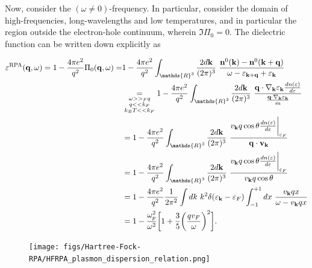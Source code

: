 Now, consider the $(\omega \neq 0)$-frequency. In particular, consider the domain of high-frequencies, long-wavelengths and low temperatures, and in particular the region outside the electron-hole continuum, wherein $\Im \Pi_0 = 0$. The dielectric function can be written down explicitly as 

\begin{equation}
    \begin{split}
        \varepsilon^{\textnormal{RPA}}({\bf q}, \omega) = 1 - \frac{4\pi e^2}{q^2} \Pi_0({\bf q}, \omega) =& 1 - \frac{4\pi e^2}{q^2} \int_{\mathds{R}^3} \frac{2d{\bf k}}{(2\pi)^3} \blanky \frac{{\bf n}^0({\bf k}) - {\bf n}^0({\bf k+q})}{\omega - \varepsilon_{{\bf k+q}} + \varepsilon_{{\bf k}}} \\
        & \underset{{\substack{\omega >> _F q \\
        q << k_F \\
        k_B T << k_F}}}{=} 1 - \frac{4\pi e^2}{q^2} \int_{\mathds{R}^3} \frac{2d{\bf k}}{(2\pi)^3} \blanky \frac{
        {\bf q} \cdot \nabla_{{\bf k}}
        \varepsilon_{{\bf k}} \frac{d n(\varepsilon)}{d\varepsilon}}
        { \frac{{\bf q} \cdot \nabla_{{\bf k}} \varepsilon_{{\bf k}}}{m} } \\
        &= 1 - \frac{4\pi e^2}{q^2} \int_{\mathds{R}^3} \frac{2d{\bf k}}{(2\pi)^3} \blanky \frac{ v_{{\bf k}} q \cos \theta \frac{dn(\varepsilon)}{d\varepsilon}\bigg|_{\varepsilon_F}
        }
        { {\bf q} \cdot {\bf v}_{{\bf k}} } \\
        &= 1 - \frac{4\pi e^2}{q^2} \int_{\mathds{R}^3} \frac{2d{\bf k}}{(2\pi)^3} \blanky \frac{ v_{{\bf k}} q \cos \theta \frac{dn(\varepsilon)}{d\varepsilon}\bigg|_{\varepsilon_F}
        }
        { {v}_{{\bf k}} q \cos \theta} \\
        &= 1 - \frac{4\pi e^2}{q^2} \frac{1}{2\pi^2}\int dk \blanky k^2 \delta(\varepsilon_{{\bf k}} - \varepsilon_F) \int_{-1}^{+1} dx \blanky \frac{v_{{\bf k}} q x}{ \omega - v_{{\bf k}} qx} \\
        &= 1 - \frac{\omega_p^2}{\omega^2} \bigg[
        1+ \frac{3}{5} \bigg(\frac{qv_F}{\omega}\bigg)^2
        \bigg].
    \end{split}
\end{equation}

\begin{figure}
\texttt{[image: figs/Hartree-Fock-RPA/HFRPA\_plasmon\_dispersion\_relation.png]}
\end{figure}  

